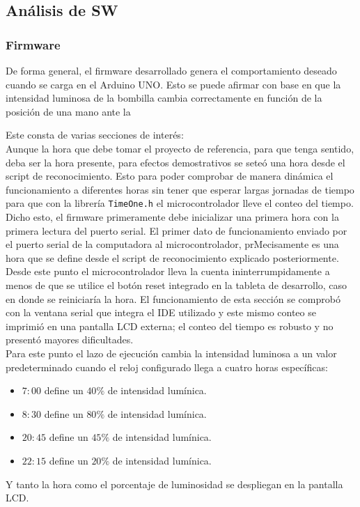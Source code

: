 \subsection{Análisis de SW}

\subsubsection{Firmware}

De forma general, el firmware desarrollado genera el comportamiento deseado cuando se carga en el Arduino UNO. Esto se puede afirmar con base en que la intensidad luminosa de la bombilla cambia correctamente en función de la posición de una mano ante la 


Este consta de varias secciones de interés: \\
Aunque la hora que debe tomar el proyecto de referencia, para que tenga sentido, deba ser la hora presente, para efectos demostrativos se seteó una hora desde el script de reconocimiento. Esto para poder comprobar de manera dinámica el funcionamiento a diferentes horas sin tener que esperar largas jornadas de tiempo para que con la librería \texttt{TimeOne.h} el microcontrolador lleve el conteo del tiempo. Dicho esto, el firmware primeramente debe inicializar una primera hora con la primera lectura del puerto serial. El primer dato de funcionamiento enviado por el puerto serial de la computadora al microcontrolador, prMecisamente es una hora que se define desde el script de reconocimiento explicado posteriormente. Desde este punto el microcontrolador lleva la cuenta ininterrumpidamente a menos de que se utilice el botón  reset integrado en la tableta de desarrollo, caso en donde se reiniciaría la hora. El funcionamiento de esta sección se comprobó con la ventana serial que integra el IDE utilizado y este mismo conteo se imprimió en una pantalla LCD externa; el conteo del tiempo es robusto y no presentó mayores dificultades.\\
Para este punto el lazo de ejecución cambia la intensidad luminosa a un valor predeterminado cuando el reloj configurado llega a cuatro horas específicas:
\begin{itemize}
    \item $7:00$ define un $40\%$ de intensidad lumínica.
    \item $8:30$ define un $80\%$ de intensidad lumínica.
    \item $20:45$ define un $45\%$ de intensidad lumínica.
    \item $22:15$ define un $20\%$ de intensidad lumínica.
\end{itemize}
Y tanto la hora como el porcentaje de luminosidad se despliegan en la pantalla LCD.\\

